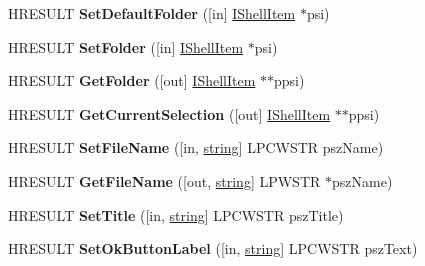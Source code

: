 \begin{DoxyCompactItemize}
\item 
\mbox{\label{interface_i_file_dialog_a873ee030814f406172c03fd671064540}} 
H\+R\+E\+S\+U\+LT {\bfseries Set\+Default\+Folder} (\mbox{[}in\mbox{]} \hyperlink{interface_i_shell_item}{I\+Shell\+Item} $\ast$psi)
\item 
\mbox{\label{interface_i_file_dialog_a2dbf0b3f745f1daca655892036756635}} 
H\+R\+E\+S\+U\+LT {\bfseries Set\+Folder} (\mbox{[}in\mbox{]} \hyperlink{interface_i_shell_item}{I\+Shell\+Item} $\ast$psi)
\item 
\mbox{\label{interface_i_file_dialog_a8905362cfb342574c2c0b75721f70a1a}} 
H\+R\+E\+S\+U\+LT {\bfseries Get\+Folder} (\mbox{[}out\mbox{]} \hyperlink{interface_i_shell_item}{I\+Shell\+Item} $\ast$$\ast$ppsi)
\item 
\mbox{\label{interface_i_file_dialog_a3a0434d9979123c84d569fcf5f6f24b7}} 
H\+R\+E\+S\+U\+LT {\bfseries Get\+Current\+Selection} (\mbox{[}out\mbox{]} \hyperlink{interface_i_shell_item}{I\+Shell\+Item} $\ast$$\ast$ppsi)
\item 
\mbox{\label{interface_i_file_dialog_a6f70c140cfced0eab7fa55a3a679287e}} 
H\+R\+E\+S\+U\+LT {\bfseries Set\+File\+Name} (\mbox{[}in, \hyperlink{structstring}{string}\mbox{]} L\+P\+C\+W\+S\+TR psz\+Name)
\item 
\mbox{\label{interface_i_file_dialog_ae03252c0c315aa5dc500c357ee0a8d70}} 
H\+R\+E\+S\+U\+LT {\bfseries Get\+File\+Name} (\mbox{[}out, \hyperlink{structstring}{string}\mbox{]} L\+P\+W\+S\+TR $\ast$psz\+Name)
\item 
\mbox{\label{interface_i_file_dialog_ac4ea8be4a1c5ca155b9df53e7d2642d3}} 
H\+R\+E\+S\+U\+LT {\bfseries Set\+Title} (\mbox{[}in, \hyperlink{structstring}{string}\mbox{]} L\+P\+C\+W\+S\+TR psz\+Title)
\item 
\mbox{\label{interface_i_file_dialog_aea9b917488c8680496ad5228720fc4b3}} 
H\+R\+E\+S\+U\+LT {\bfseries Set\+Ok\+Button\+Label} (\mbox{[}in, \hyperlink{structstring}{string}\mbox{]} L\+P\+C\+W\+S\+TR psz\+Text)
\item 

\end{DoxyCompactItemize}
